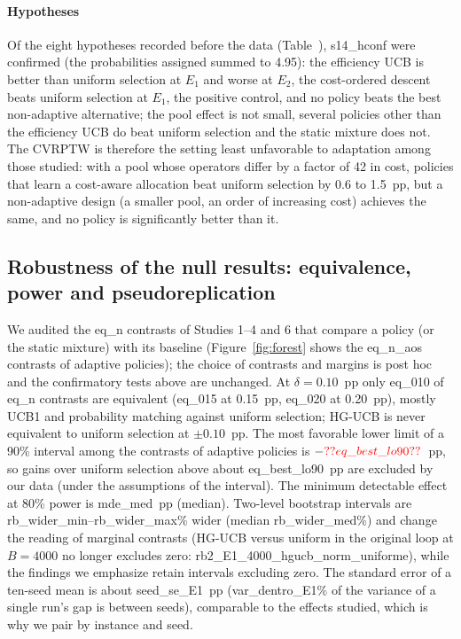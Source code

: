 \paragraph{Hypotheses} Of the eight hypotheses recorded before the data (Table~), \num{s14_hconf} were confirmed (the probabilities assigned summed to 4.95): the efficiency UCB is better than uniform selection at $E_1$ and worse at $E_2$, the cost-ordered descent beats uniform selection at $E_1$, the positive control, and no policy beats the best non-adaptive alternative; the pool effect is not small, several policies other than the efficiency UCB do beat uniform selection and the static mixture does not. The CVRPTW is therefore the setting least unfavorable to adaptation among those studied: with a pool whose operators differ by a factor of 42 in cost, policies that learn a cost-aware allocation beat uniform selection by 0.6 to 1.5~pp, but a non-adaptive design (a smaller pool, an order of increasing cost) achieves the same, and no policy is significantly better than it.

\subsection{Robustness of the null results: equivalence, power and pseudoreplication}\label{sec:robust}
We audited the \num{eq_n} contrasts of Studies 1--4 and 6 that compare a policy (or the static mixture) with its baseline (Figure~\ref{fig:forest} shows the \num{eq_n_aos} contrasts of adaptive policies); the choice of contrasts and margins is post hoc and the confirmatory tests above are unchanged. At $\delta=0.10$~pp only \num{eq_010} of \num{eq_n} contrasts are equivalent (\num{eq_015} at 0.15~pp, \num{eq_020} at 0.20~pp), mostly UCB1 and probability matching against uniform selection; HG-UCB is never equivalent to uniform selection at $\pm0.10$~pp. The most favorable lower limit of a 90\% interval among the contrasts of adaptive policies is $-\num{eq_best_lo90}$~pp, so gains over uniform selection above about \num{eq_best_lo90}~pp are excluded by our data (under the assumptions of the interval). The minimum detectable effect at 80\% power is \num{mde_med}~pp (median). Two-level bootstrap intervals are \num{rb_wider_min}--\num{rb_wider_max}\% wider (median \num{rb_wider_med}\%) and change the reading of marginal contrasts (HG-UCB versus uniform in the original loop at $B=4000$ no longer excludes zero: \num{rb2_E1_4000_hgucb_norm_uniforme}), while the findings we emphasize retain intervals excluding zero. The standard error of a ten-seed mean is about \num{seed_se_E1}~pp (\num{var_dentro_E1}\% of the variance of a single run's gap is between seeds), comparable to the effects studied, which is why we pair by instance and seed.

